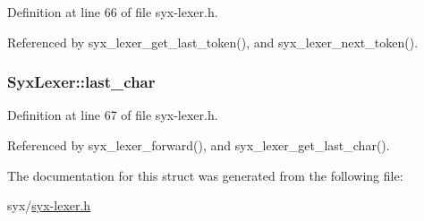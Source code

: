 Definition at line 66 of file syx-lexer.h.

Referenced by syx\_\-lexer\_\-get\_\-last\_\-token(), and syx\_\-lexer\_\-next\_\-token().\hypertarget{struct_syx_lexer_34daff41871bf401a01f6e384d3ccb9b}{
\subsubsection{ {\bf SyxLexer::last\_\-char}}}
\label{struct_syx_lexer_34daff41871bf401a01f6e384d3ccb9b}




Definition at line 67 of file syx-lexer.h.

Referenced by syx\_\-lexer\_\-forward(), and syx\_\-lexer\_\-get\_\-last\_\-char().

The documentation for this struct was generated from the following file:\begin{CompactItemize}
\item 
syx/\hyperlink{syx-lexer_8h}{syx-lexer.h}\end{CompactItemize}
